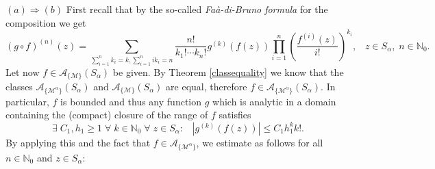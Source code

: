 \documentclass[11pt,a4paper]{article}
\makeatletter
\theoremstyle{plain}
\theoremstyle{definition}
\DeclareRobustCommand\widecheck[1]{{\mathpalette\@widecheck{#1}}}
\def\@widecheck#1#2{%
	\setbox\z@\hbox{\m@th$#1#2$}%
	\setbox\tw@\hbox{\m@th$#1%
		\widehat{%
			\vrule\@width\z@\@height\ht\z@
			\vrule\@height\z@\@width\wd\z@}$}%
	\dp\tw@-\ht\z@
	\@tempdima\ht\z@ \advance\@tempdima2\ht\tw@ \divide\@tempdima\thr@@
	\setbox\tw@\hbox{%
		 \raise\@tempdima\hbox{\scalebox{1}[-1]{\lower\@tempdima\box
				\tw@}}}%
	{\ooalign{\box\tw@ \cr \box\z@}}}
\renewcommand{\check}[1]{\widecheck{#1}}
\newcommand{\NN}{\mathbb{N}}
\let\on=\operatorname
\DeclareRobustCommand\widecheck[1]{{\mathpalette\@widecheck{#1}}}
\def\@widecheck#1#2{%
    \setbox\z@\hbox{\m@th$#1#2$}%
    \setbox\tw@\hbox{\m@th$#1%
       \widehat{%
          \vrule\@width\z@\@height\ht\z@
          \vrule\@height\z@\@width\wd\z@}$}%
    \dp\tw@-\ht\z@
    \@tempdima\ht\z@ \advance\@tempdima2\ht\tw@ \divide\@tempdima\thr@@
    \setbox\tw@\hbox{%
       \raise\@tempdima\hbox{\scalebox{1}[-1]{\lower\@tempdima\box
\tw@}}}%
    {\ooalign{\box\tw@ \cr \box\z@}}}
\makeatother
\begin{document}
$(a)\Rightarrow(b)$ First recall that by the so-called {\itshape Fa\`{a}-di-Bruno formula} for the composition we get
$$(g\circ f)^{(n)}(z)=\sum_{\sum_{i=1}^nk_i=k, \sum_{i=1}^nik_i=n}\frac{n!}{k_1!\cdots k_n!}g^{(k)}(f(z))\prod_{i=1}^n\left(\frac{f^{(i)}(z)}{i!}\right)^{k_i},\;\;\;z\in S_{\alpha},\;n\in\NN_0.$$
%
%
%
Let now $f\in\mathcal{A}_{\{\mathcal{M}\}}(S_{\alpha})$ be given. By Theorem \ref{classequality} we know that the classes $\mathcal{A}_{\{\mathcal{M}^{\alpha}\}}(S_{\alpha})$ and $ \mathcal{A}_{\{\mathcal{M}\}}(S_{\alpha})$ are equal, therefore $f\in\mathcal{A}_{\{\mathcal{M}^{\alpha}\}}(S_{\alpha})$. In particular, $f$ is bounded and thus any function $g$ which is analytic in a domain containing the (compact) closure of the range of $f$ satisfies
\begin{equation}\label{analyticbounded}
	\exists\;C_1,h_1\ge 1\;\forall\;k\in\NN_0\;\forall\;z\in S_{\alpha}:\;\;\;|g^{(k)}(f(z))|\le C_1h_1^kk!.
\end{equation}
By applying this and the fact that $f\in\mathcal{A}_{\{\mathcal{M^\alpha}\}}$, we estimate as follows for all $n\in\NN_0$ and $z\in S_{\alpha}$:
\end{document}
